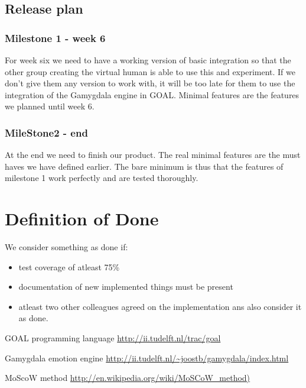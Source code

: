 \documentclass[]{article}
\begin{document}
\subsection{Release plan}
\subsubsection{Milestone 1 - week 6}
For week six we need to have a working version of basic integration so that the other group creating the virtual human is able to use this and experiment. If we don't give them any version to work with, it will be too late for them to use the integration of the Gamygdala engine in GOAL. Minimal features are the features we planned until week 6.
\subsubsection{MileStone2 - end}
At the end we need to finish our product. The real minimal features are the must haves we have defined earlier. The bare minimum is thus that the features of milestone 1 work perfectly and are tested thoroughly.
\pagebreak
\section{Definition of Done}
We consider something as done if:
\begin{itemize}
	\item test coverage of atleast 75\%
	\item documentation of new implemented things must be present
	\item atleast two other colleagues agreed on the implementation ans also consider it as done.
\end{itemize}

\clearpage
\printglossaries


\begin{thebibliography}{9}
	
	GOAL programming language
	\url{http://ii.tudelft.nl/trac/goal}
	
	Gamygdala emotion engine
	\url{http://ii.tudelft.nl/~joostb/gamygdala/index.html}
	
	MoScoW method
	\url{http://en.wikipedia.org/wiki/MoSCoW_method) }
	
	
\end{thebibliography}
\end{document}
